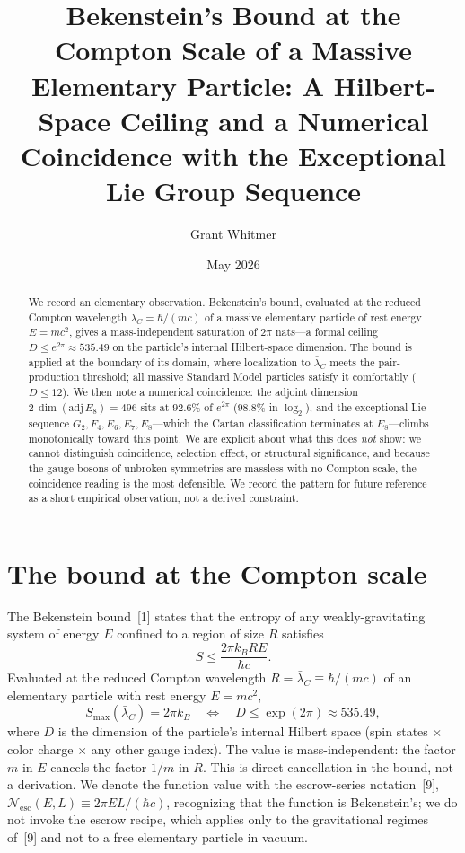 \documentclass[11pt]{article}
\title{Bekenstein's Bound at the Compton Scale of a Massive\\[2pt]
\large Elementary Particle: A Hilbert-Space Ceiling and a Numerical\\
Coincidence with the Exceptional Lie Group Sequence}
\author{Grant Whitmer}
\date{May 2026}
\newcommand{\Nesc}{\mathcal{N}_{\mathrm{esc}}}
\newcommand{\lbar}{\bar\lambda_{C}}
\begin{document}
\maketitle

\begin{abstract}
We record an elementary observation. Bekenstein's bound, evaluated at the reduced Compton
wavelength $\lbar = \hbar/(mc)$ of a massive elementary particle of rest energy $E = mc^{2}$,
gives a mass-independent saturation of $2\pi$ nats---a formal ceiling
$D \le e^{2\pi} \approx 535.49$ on the particle's internal Hilbert-space dimension. The bound is
applied at the boundary of its domain, where localization to $\lbar$ meets the pair-production
threshold; all massive Standard Model particles satisfy it comfortably ($D \le 12$). We then note
a numerical coincidence: the adjoint dimension $2\,\dim(\mathrm{adj}\,E_{8}) = 496$ sits at
$92.6\%$ of $e^{2\pi}$ ($98.8\%$ in $\log_{2}$), and the exceptional Lie sequence
$G_{2}, F_{4}, E_{6}, E_{7}, E_{8}$---which the Cartan classification terminates at $E_{8}$---climbs
monotonically toward this point. We are explicit about what this does \emph{not} show: we cannot
distinguish coincidence, selection effect, or structural significance, and because the gauge bosons
of unbroken symmetries are massless with no Compton scale, the coincidence reading is the most
defensible. We record the pattern for future reference as a short empirical observation, not a
derived constraint.
\end{abstract}

\section{The bound at the Compton scale}

The Bekenstein bound~[1] states that the entropy of any weakly-gravitating system of energy $E$
confined to a region of size $R$ satisfies
\begin{equation}
  S \le \frac{2\pi k_{B} R E}{\hbar c}.
\end{equation}
Evaluated at the reduced Compton wavelength $R = \lbar \equiv \hbar/(mc)$ of an elementary particle
with rest energy $E = mc^{2}$,
\begin{equation}
  S_{\max}(\lbar) = 2\pi k_{B}
  \quad\Longleftrightarrow\quad
  D \le \exp(2\pi) \approx 535.49,
\end{equation}
where $D$ is the dimension of the particle's internal Hilbert space (spin states $\times$ color
charge $\times$ any other gauge index). The value is mass-independent: the factor $m$ in $E$ cancels
the factor $1/m$ in $R$. This is direct cancellation in the bound, not a derivation. We denote the
function value with the escrow-series notation~[9], $\Nesc(E, L) \equiv 2\pi E L/(\hbar c)$,
recognizing that the function is Bekenstein's; we do not invoke the escrow recipe, which applies only
to the gravitational regimes of~[9] and not to a free elementary particle in vacuum.
\end{document}

